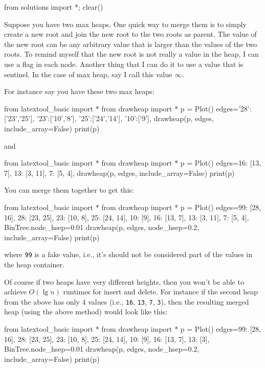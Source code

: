 \begin{python0}
from solutions import *; clear()
\end{python0}

Suppose you have two max heaps.
One quick way to merge them is to simply create a new root
and join the new root to the two roots as parent.
The value of the new root can be any arbitrary value that
is larger than the values of the two roots.
To remind myself that the new root is not really a value in the
heap, I can use a flag in each node.
Another thing that I can do it to use a value that is sentinel.
In the case of max heap, say I call this value $\infty$.

For instance say you have these two max heaps:
\begin{python}
from latextool_basic import *
from drawheap import *
p = Plot()
edges={'28':['23','25'],
       '23':['10','8'],
       '25':['24','14'],
       '10':['9'],
       }
drawheap(p, edges, include_array=False)
print(p)
\end{python}

and

\begin{python}
from latextool_basic import *
from drawheap import *
p = Plot()
edges={16: [13, 7],
       13: [3, 11],
       7: [5, 4],
       }
drawheap(p, edges, include_array=False)
print(p)
\end{python}


You can merge them together to get this:

\begin{python}
from latextool_basic import *
from drawheap import *
p = Plot()
edges={99: [28, 16],
       28: [23, 25],
       23: [10, 8],
       25: [24, 14],
       10: [9],
       16: [13, 7],
       13: [3, 11],
        7: [5, 4],
      }
BinTree.node_hsep=0.01
drawheap(p, edges, node_hsep=0.2, include_array=False)
print(p)
\end{python}

where \verb!99! is a fake value, i.e.,
it's 
should not be considered part of the values in
the heap container.

Of course if two heaps have very different
heights, then you won't
be able to achieve
$O(\lg n)$ runtimes for insert and delete.
For instance if the second heap from the above
has only 4 values
(i.e., \verb!16!, \verb!13!, \verb!7!, \verb!3!),
then the resulting
merged heap (using the above method)
would look like this:

\begin{python}
from latextool_basic import *
from drawheap import *
p = Plot()
edges={99: [28, 16],
       28: [23, 25],
       23: [10, 8],
       25: [24, 14],
       10: [9],
       16: [13, 7],
       13: [3],
      }
BinTree.node_hsep=0.01
drawheap(p, edges, node_hsep=0.2, include_array=False)
print(p)
\end{python}
